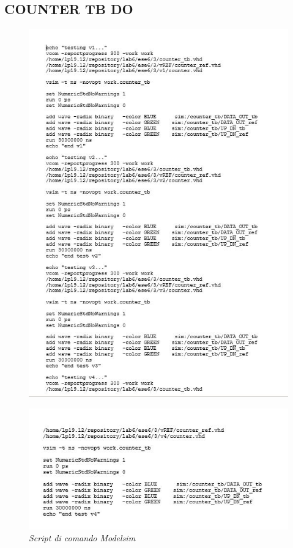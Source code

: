 \subsection{COUNTER TB DO}
\begin{figure}[!htb]
	\centering
	\includegraphics[scale=1.2]{immagini/counterdo1}
	\label{counterdo1}
\end{figure}
\begin{figure}[!htb]
	\centering
	\includegraphics[scale=1.2]{immagini/counterdo2}
	\caption{\textit{Script di comando Modelsim}}
	\label{counterdo2}
\end{figure}
\newpage
